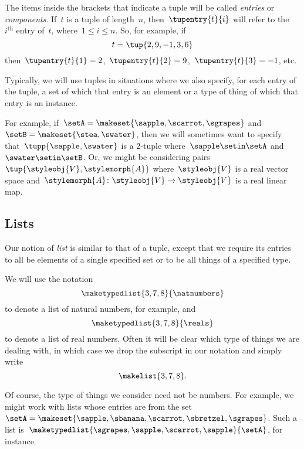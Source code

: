 The items inside the brackets that indicate a tuple will be called \emph{entries} or \emph{components}.
If~$t$ is a tuple of length~$n$, then~$\tupentry{t}{i}$ will refer to the~$i^{\text{th}}$ entry of~$t$, where~$1 \leq i \leq n$.
So, for example, if
\begin{equation*}
    t = \tup{2,9,-1, 3, 6}
\end{equation*}
then~$\tupentry{t}{1} = 2$,~$\tupentry{t}{2} = 9$,~$\tupentry{t}{3} = -1$, etc.

Typically, we will use tuples in situations where we also specify, for each entry of the tuple, a set of which that entry is an element or a type of thing of which that entry is an instance.

For example, if~$\setA = \makeset{ \sapple, \scarrot, \sgrapes}$ and~$\setB = \makeset{ \stea, \swater }$, then we will sometimes want to specify that~$\tupp{\sapple, \swater}$ is a 2-tuple where~$\sapple \setin\setA$ and~$\swater \setin\setB$.
Or, we might be considering pairs~$\tup{\styleobj{V}, \stylemorph{A}}$ where~$\styleobj{V}$ is a real vector space and~$\stylemorph{A}\colon \styleobj{V} \to \styleobj{V}$ is a real linear map.

\subsection{Lists}
\label{sec:lists}

Our notion of \emph{list} is similar to that of a tuple, except that we require its entries to all be elements of a single specified set or to be all things of a specified type.

We will use the notation
\begin{equation*}
    \maketypedlist{3, 7, 8}{\natnumbers}
\end{equation*}
to denote a list of natural numbers, for example, and
\begin{equation*}
    \maketypedlist{3, 7, 8}{\reals}
\end{equation*}
to denote a list of real numbers.
Often it will be clear which type of things we are dealing with, in which case we drop the subscript in our notation and simply write
\begin{equation*}
    \makelist{3, 7, 8}.
\end{equation*}

Of course, the type of things we consider need not be numbers.
For example, we might work with lists whose entries are from the set~$\setA = \makeset{\sapple, \sbanana, \scarrot, \sbretzel, \sgrapes}$.
Such a list is~$\maketypedlist{\sgrapes, \sapple, \scarrot, \sapple}{\setA}$, for instance.

